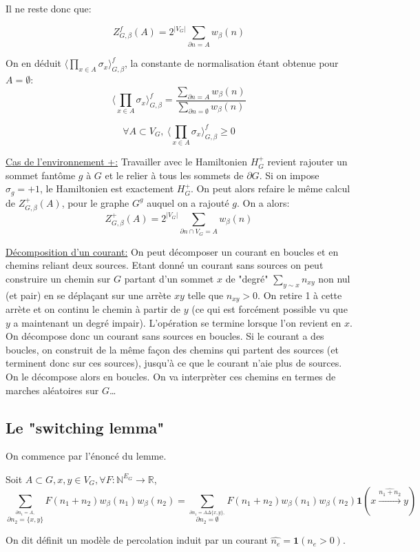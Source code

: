 \documentclass[a4paper,12pt]{report}
\begin{document}
Il ne reste donc que:
\begin{prop}
$$
Z_{G,\beta}^f(A) = 2^{\vert V_G \vert} \sum_{\partial n  = A} w_{\beta}(n)
$$
\end{prop}

On en déduit $\langle \prod_{x \in A} \sigma_x \rangle_{G,\beta}^f$, la constante de normalisation étant obtenue pour $A = \emptyset$:
$$
\langle \prod_{x \in A} \sigma_x \rangle_{G,\beta}^f = \frac{\sum_{\partial n = A} w_{\beta}(n)}{\sum_{\partial n = \emptyset} w_{\beta}(n)}
$$

\begin{prop}
$$
\forall A \subset V_G, \ \langle \prod_{x \in A} \sigma_x \rangle_{G,\beta}^f \geq 0
$$
\end{prop}

\underline{Cas de l'environnement +:}
Travailler avec le Hamiltonien $H_{G}^+$ revient rajouter un sommet fantôme $g$ à $G$ et le relier à tous les sommets de $\partial G$. Si on impose $\sigma_g = +1$, le Hamiltonien est exactement $H_{G}^+$. On peut alors refaire le même calcul de $Z_{G,\beta}^+(A)$, pour le graphe $G^g$ auquel on a rajouté $g$. On a alors:
$$
Z_{G,\beta}^+(A) = 2^{\vert V_G \vert} \sum_{\partial n \cap V_G  = A} w_{\beta}(n)
$$

\underline{Décomposition d'un courant:} On peut décomposer un courant en boucles et en chemins reliant deux sources. Etant donné un courant sans sources on peut construire un chemin sur $G$ partant d'un sommet $x$ de "degré" $\sum_{y \sim x} n_{xy}$ non nul (et pair) en se déplaçant sur une arrète $xy$ telle que $n_{xy}>0$. On retire 1 à cette arrète et on continu le chemin à partir de $y$ (ce qui est forcément possible vu que $y$ a maintenant un degré impair). L'opération se termine lorsque l'on revient en $x$. On décompose donc un courant sans sources en boucles. Si le courant a des boucles, on construit de la même façon des chemins qui partent des sources (et terminent donc sur ces sources), jusqu'à ce que le courant n'aie plus de sources. On le décompose alors en boucles. On va interprèter ces chemins en termes de marches aléatoires sur $G$\dots

\subsection{Le "switching lemma"}

On commence par l'énoncé du lemme.
\begin{thm}
Soit $A\subset G, x,y \in V_G, \forall F: \mathbb{N}^{E_G} \rightarrow \mathbb{R}$,
$$\sum_{\overset{\partial n_1 = A,}{\partial n_2 = \{x,y\}}} F(n_1+n_2)w_\beta(n_1)w_\beta(n_2) = \sum_{\overset{\partial n_1 = A \Delta\{x,y\},}{\partial n_2 = \emptyset}}F(n_1+n_2)w_\beta(n_1)w_\beta(n_2)\mathbf{1}(x\overset{\widehat{n_1+n_2}}{\longrightarrow}y)
$$
\end{thm}
On dit définit un modèle de percolation induit par un courant $\hat{n_e} = \mathbf{1}(n_e>0)$.
\end{document}
